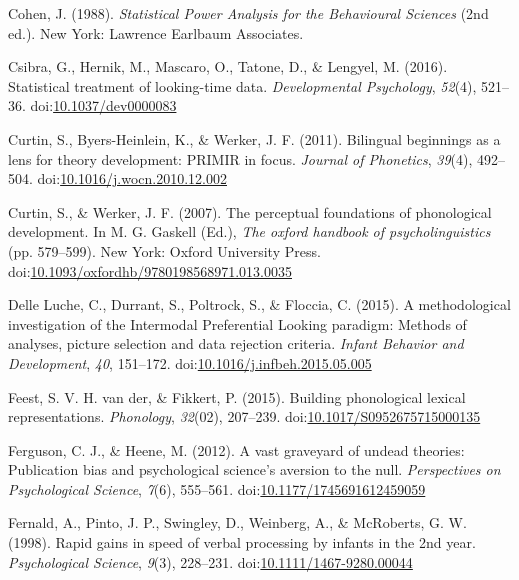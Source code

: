 \documentclass[man]{apa6}
\begin{document}
\leavevmode\hypertarget{ref-cohen}{}%
Cohen, J. (1988). \emph{Statistical Power Analysis for the Behavioural Sciences} (2nd ed.). New York: Lawrence Earlbaum Associates.

\leavevmode\hypertarget{ref-Csibra2016}{}%
Csibra, G., Hernik, M., Mascaro, O., Tatone, D., \& Lengyel, M. (2016). Statistical treatment of looking-time data. \emph{Developmental Psychology}, \emph{52}(4), 521--36. doi:\href{https://doi.org/10.1037/dev0000083}{10.1037/dev0000083}

\leavevmode\hypertarget{ref-Curtin2011}{}%
Curtin, S., Byers-Heinlein, K., \& Werker, J. F. (2011). Bilingual beginnings as a lens for theory development: PRIMIR in focus. \emph{Journal of Phonetics}, \emph{39}(4), 492--504. doi:\href{https://doi.org/10.1016/j.wocn.2010.12.002}{10.1016/j.wocn.2010.12.002}

\leavevmode\hypertarget{ref-Curtin2007}{}%
Curtin, S., \& Werker, J. F. (2007). The perceptual foundations of phonological development. In M. G. Gaskell (Ed.), \emph{The oxford handbook of psycholinguistics} (pp. 579--599). New York: Oxford University Press. doi:\href{https://doi.org/10.1093/oxfordhb/9780198568971.013.0035}{10.1093/oxfordhb/9780198568971.013.0035}

\leavevmode\hypertarget{ref-DelleLuche2015}{}%
Delle Luche, C., Durrant, S., Poltrock, S., \& Floccia, C. (2015). A methodological investigation of the Intermodal Preferential Looking paradigm: Methods of analyses, picture selection and data rejection criteria. \emph{Infant Behavior and Development}, \emph{40}, 151--172. doi:\href{https://doi.org/10.1016/j.infbeh.2015.05.005}{10.1016/j.infbeh.2015.05.005}

\leavevmode\hypertarget{ref-vanderFeest2015}{}%
Feest, S. V. H. van der, \& Fikkert, P. (2015). Building phonological lexical representations. \emph{Phonology}, \emph{32}(02), 207--239. doi:\href{https://doi.org/10.1017/S0952675715000135}{10.1017/S0952675715000135}

\leavevmode\hypertarget{ref-Ferguson2012}{}%
Ferguson, C. J., \& Heene, M. (2012). A vast graveyard of undead theories: Publication bias and psychological science's aversion to the null. \emph{Perspectives on Psychological Science}, \emph{7}(6), 555--561. doi:\href{https://doi.org/10.1177/1745691612459059}{10.1177/1745691612459059}

\leavevmode\hypertarget{ref-Fernald1998}{}%
Fernald, A., Pinto, J. P., Swingley, D., Weinberg, A., \& McRoberts, G. W. (1998). Rapid gains in speed of verbal processing by infants in the 2nd year. \emph{Psychological Science}, \emph{9}(3), 228--231. doi:\href{https://doi.org/10.1111/1467-9280.00044}{10.1111/1467-9280.00044}
\end{document}
